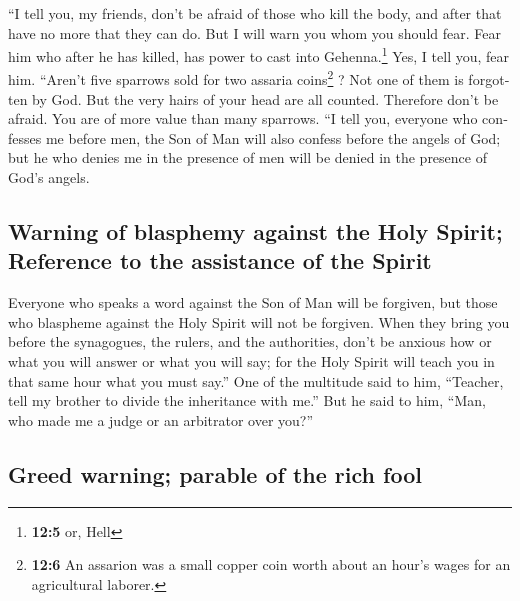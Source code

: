 \begin{paracol}{2}
\begin{otherlanguage}{english}
 ``I tell you, my friends, don't be afraid of those who
kill the body, and after that have no more that they can do.
 But I will warn you whom you should fear. Fear him who
after he has killed, has power to cast into Gehenna.\footnote{\textbf{12:5}
  or, Hell} Yes, I tell you, fear him.  ``Aren't five
sparrows sold for two assaria coins\footnote{\textbf{12:6} An assarion
  was a small copper coin worth about an hour's wages for an
  agricultural laborer.} ? Not one of them is forgotten by God.
 But the very hairs of your head are all counted.
Therefore don't be afraid. You are of more value than many sparrows.
 ``I tell you, everyone who confesses me before men, the
Son of Man will also confess before the angels of God; 
but he who denies me in the presence of men will be denied in the
presence of God's angels.

\hypertarget{warning-of-blasphemy-against-the-holy-spirit-reference-to-the-assistance-of-the-spirit}{%
\subsection{Warning of blasphemy against the Holy Spirit; Reference to
the assistance of the
Spirit}\label{warning-of-blasphemy-against-the-holy-spirit-reference-to-the-assistance-of-the-spirit}}

 Everyone who speaks a word against the Son of Man will
be forgiven, but those who blaspheme against the Holy Spirit will not be
forgiven.  When they bring you before the synagogues, the
rulers, and the authorities, don't be anxious how or what you will
answer or what you will say;  for the Holy Spirit will
teach you in that same hour what you must say.''  One of
the multitude said to him, ``Teacher, tell my brother to divide the
inheritance with me.''  But he said to him, ``Man, who
made me a judge or an arbitrator over you?''

\hypertarget{greed-warning-parable-of-the-rich-fool}{%
\subsection{Greed warning; parable of the rich
fool}\label{greed-warning-parable-of-the-rich-fool}}


\end{otherlanguage}
\end{paracol}
